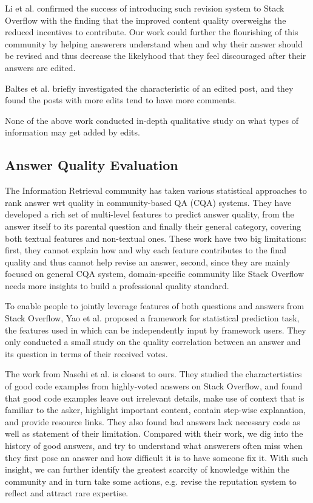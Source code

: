 \documentclass[10pt,conference]{IEEEtran}
\begin{document}
Li et al. \cite{7208aa781175403f9c3aaddc19f3b8cf} confirmed the success of introducing such revision system to Stack Overflow with the finding that the improved content quality overweighs the reduced incentives to contribute. Our work could further the flourishing of this community by helping answerers understand when and why their answer should be revised and thus decrease the likelyhood that they feel discouraged after their answers are edited. 

Baltes et al. \cite{DBLP:journals/corr/abs-1803-07311} briefly investigated the characteristic of an edited post, and they found the posts with more edits tend to have more comments.  

None of the above work conducted in-depth qualitative study on what types of information may get added by edits. 

\subsection {Answer Quality Evaluation}

The Information Retrieval community has taken various statistical approaches to rank answer wrt quality in community-based QA (CQA) systems. \cite{DBLP:journals/corr/SugguGCS16, Dalip:2013:EUF:2484028.2484072, Shah:2010:EPA:1835449.1835518, 7857066} They have developed a rich set of multi-level features to predict answer quality, from the answer itself to its parental question and finally their general category, covering both textual features and non-textual ones. These work have two big limitations: first, they cannot explain how and why each feature contributes to the final quality and thus cannot help revise an answer, second, since they are mainly focused on general CQA system, domain-specific community like Stack Overflow needs more insights to build a professional quality standard.    

To enable people to jointly leverage features of both questions and answers from Stack Overflow, Yao et al. \cite{DBLP:journals/corr/YaoTXAXL13} proposed a framework for statistical prediction task, the features used in which can be independently input by framework users. They only conducted a small study on the quality correlation between an answer and its question in terms of their received votes.  

The work from Nasehi et al. \cite{DBLP:conf/icsm/NasehiSMB12} is closest to ours. They studied the charactertistics of good code examples from highly-voted answers on Stack Overflow, and found that good code examples leave out irrelevant details, make use of context that is familiar to the asker, highlight important content, contain step-wise explanation, and provide resource links. They also found bad answers lack necessary code as well as statement of their limitation. Compared with their work, we dig into the history of good answers, and try to understand what answerers often miss when they first pose an answer and how difficult it is to have someone fix it. With such insight, we can further identify the greatest scarcity of knowledge within the community and in turn take some actions, e.g. revise the reputation system to reflect and attract rare expertise.      
\end{document}
